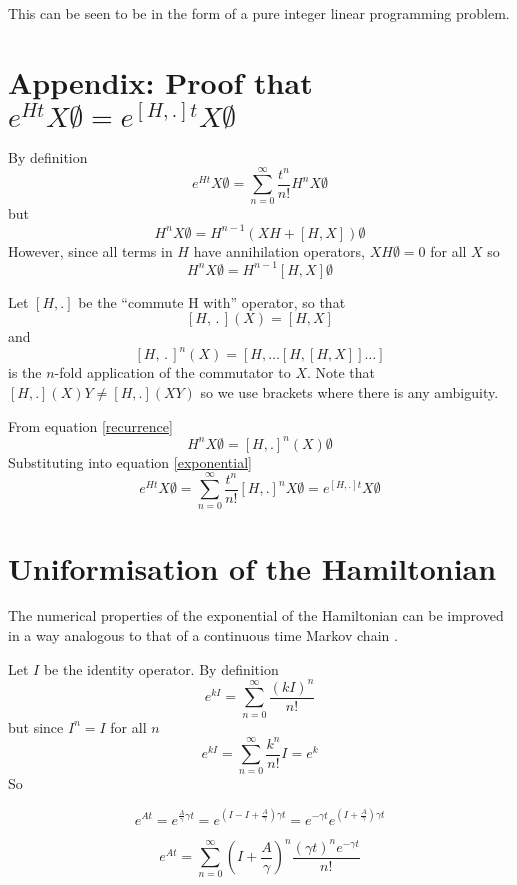 \documentclass{article}
\begin{document}
This can be seen to be in the form of a pure integer linear programming problem.

%
% 



\newpage
\appendix

\section{Appendix: Proof that $e^{Ht}X\emptyset = e^{[H,.]t}X\emptyset$}

By definition
\begin{equation}
e^{Ht}X\emptyset = \sum_{n=0}^\infty \frac{t^n}{n!} H^nX\emptyset
\label{exponential}
\end{equation}
but
\[
H^nX\emptyset = H^{n-1}(XH + [H,X])\emptyset
\]
However, since all terms in $H$ have annihilation operators, $XH\emptyset = 0$ for all $X$ so
\begin{equation}
H^nX\emptyset = H^{n-1}[H,X]\emptyset
\label{recurrence}
\end{equation}

Let $[H,.]$ be the ``commute H with'' operator, so that
\[
[H,\,.\,](X) = [H,X]
\]
and
\[
[H,\,.\,]^n(X) = [H,\dots [H,[H,X]]\dots ]
\]
is the $n$-fold application of the commutator to $X$. Note that $[H,.](X)Y \ne [H,.](XY)$ so we use brackets where there is any ambiguity.

From equation \ref{recurrence}
\[
H^nX\emptyset = [H,.]^n(X)\emptyset
\]
Substituting into equation \ref{exponential}
\begin{equation}
e^{Ht}X\emptyset = \sum_{n=0}^\infty \frac{t^n}{n!} [H,.]^n X\emptyset = e^{[H,.]t}X\emptyset
\label{Hcommutation}
\end{equation}

\section{Uniformisation of the Hamiltonian}
The numerical properties of the exponential of the Hamiltonian can be improved in a way analogous to that of a continuous time Markov chain \cite{reibman1988numerical}. 

Let $I$ be the identity operator. By definition
\[
e^{kI} = \sum_{n=0}^\infty \frac{(kI)^n}{n!}
\]
but since $I^n=I$ for all $n$
\[
e^{kI} = \sum_{n=0}^\infty \frac{k^n}{n!}I = e^k
\]
So

\begin{equation*}
e^{At} = e^{\frac{A}{\gamma}\gamma t} = e^{\left(I - I + \frac{A}{\gamma}\right)\gamma t} = e^{-\gamma t}e^{\left( I + \frac{A}{\gamma}\right)\gamma t}
\end{equation*}

\begin{equation}
e^{At} = \sum_{n=0}^\infty  \left(I + \frac{A}{\gamma}\right) ^n\frac{(\gamma t)^n e^{-\gamma t}}{n!}
\label{uniformisation}
\end{equation}
\end{document}
